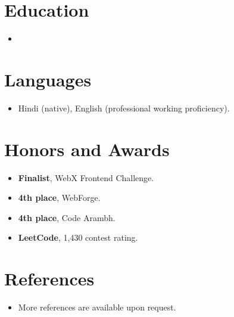 \documentclass[11pt,a4paper,sans]{moderncv}
\begin{document}

\section{Education}
\vspace{1pt}
\begin{itemize}

\item{}

\end{itemize}


\section{Languages}
\vspace{1pt}
\begin{itemize}
\item {Hindi (native), English (professional working proficiency).}
\end{itemize}


\section{Honors and Awards}
\vspace{1pt}
\begin{itemize}
\item{\textbf{Finalist}, WebX Frontend Challenge.}
\item{\textbf{4th place}, WebForge.}
\item{\textbf{4th place}, Code Arambh.}
\item{\textbf{LeetCode}, 1,430 contest rating.}
\end{itemize}


\section{References}
\vspace{1pt}
\begin{itemize}
\item{More references are available upon request.}
\end{itemize}
\end{document}

